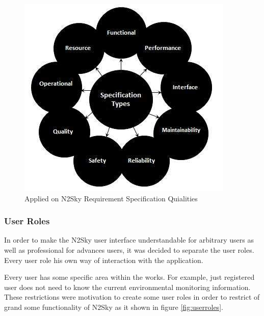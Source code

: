 \begin{figure}[htbp]
\begin{center}
  \includegraphics[scale=0.75]{components/4/pics/frs_req.jpg}
  \caption{Applied on N2Sky  Requirement Specification Quialities}
  \label{fig:frs_req}
\end{center}
\end{figure}


\subsubsection{User Roles}\label{User Roles}

In order to make the N2Sky user interface understandable for arbitrary users as well as professional for advances users, it was decided to separate the user roles. Every user role his own way of interaction with the application.

Every user has some specific area within the works. For example, just registered user does not need to know the current environmental monitoring information. These restrictions were motivation to create some user roles in order to restrict of grand some functionality of N2Sky as it shown in figure \ref{fig:userroles}.

